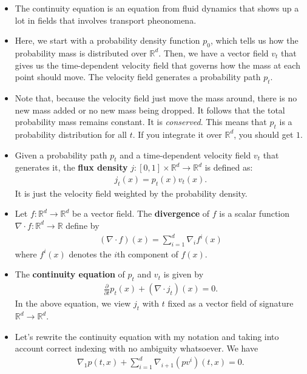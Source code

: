 \documentclass[10pt]{article}
\newcommand{\ra}{\rightarrow}
\newcommand{\Real}{\mathbb{R}}
\begin{document}
\begin{itemize}
  \item The continuity equation is an equation from fluid dynamics that shows up a lot in fields that involves transport pheonomena.
  
  \item Here, we start with a probability density function $p_0$, which tells us how the probability mass is distributed over $\Real^d$. Then, we have a vector field $v_t$ that gives us the time-dependent velocity field that governs how the mass at each point should move. The velocity field generates a probability path $p_t$.
  
  \item Note that, because the velocity field just move the mass around, there is no new mass added or no new mass being dropped. It follows that the total probability mass remains constant. It is \emph{conserved}. This means that $p_t$ is a probability distribution for all $t$. If you integrate it over $\Real^d$, you should get $1$.
  
  \item Given a probability path $p_t$ and a time-dependent velocity field $v_t$ that generates it, the {\bf flux density} $j: [0,1] \times \Real^d \ra \Real^d$ is defined as:
  \begin{align*}
    j_t(x) = p_t(x) v_t(x).
  \end{align*}
  It is just the velocity field weighted by the probability density.

  \item Let $f: \Real^d \ra \Real^d$ be a vector field. The {\bf divergence} of $f$ is a scalar function $\nabla \cdot f: \Real^d \ra \Real$ define by
  \begin{align*}
    (\nabla \cdot f)(x) = \sum_{i=1}^d \nabla_i f^i(x)
  \end{align*}
  where $f^i(x)$ denotes the $i$th component of $f(x)$.

  \item The {\bf continuity equation} of $p_t$ and $v_t$ is given by
  \begin{align*}
    \frac{\partial}{\partial t} p_t(x) + (\nabla \cdot j_t)(x) = 0.
  \end{align*}
  In the above equation, we view $j_t$ with $t$ fixed as a vector field of signature $\Real^d \ra \Real^d$.

  \item Let's rewrite the continuity equation with my notation and taking into account correct indexing with no ambiguity whatsoever. We have
  \begin{align}
    \nabla_1 p(t,x) + \sum_{i=1}^{d} \nabla_{i+1} (p v^i)(t,x) = 0. \label{eqn:continuity-no-ambiguity}
  \end{align}
  

\end{itemize}
\end{document}
